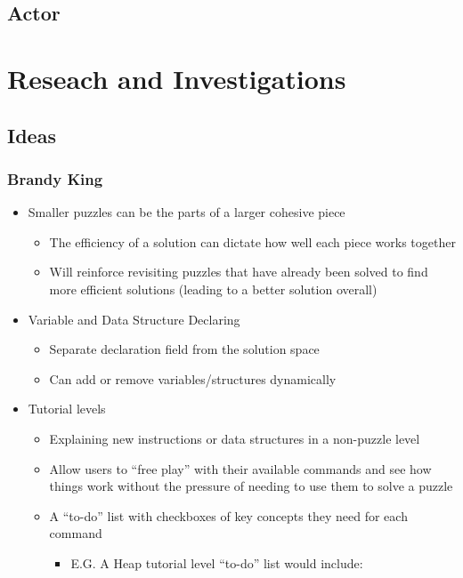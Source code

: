 \documentclass{article}
\begin{document}
\subsection{Actor}

\newpage
\section{Reseach and Investigations}

\subsection{Ideas}
\subsubsection{Brandy King}
\begin{itemize}
  \item Smaller puzzles can be the parts of a larger cohesive piece
  \begin{itemize}
    \item The efficiency of a solution can dictate how well each piece works
    together
    \item Will reinforce revisiting puzzles that have already been solved to
    find more efficient solutions (leading to a better solution overall)
  \end{itemize}
  \item Variable and Data Structure Declaring
  \begin{itemize}
    \item Separate declaration field from the solution space
    \item Can add or remove variables/structures dynamically
  \end{itemize}
  \item Tutorial levels
  \begin{itemize}
    \item Explaining new instructions or data structures in a non-puzzle level
    \item Allow users to “free play” with their available commands and see how
    things work without the pressure of needing to use them to solve a puzzle
    \item A “to-do” list with checkboxes of key concepts they need for each
    command
    \begin{itemize}
      \item E.G. A Heap tutorial level “to-do” list would include:
      \begin{itemize}

\end{itemize}
\end{itemize}
\end{itemize}
\end{itemize}
\end{document}
